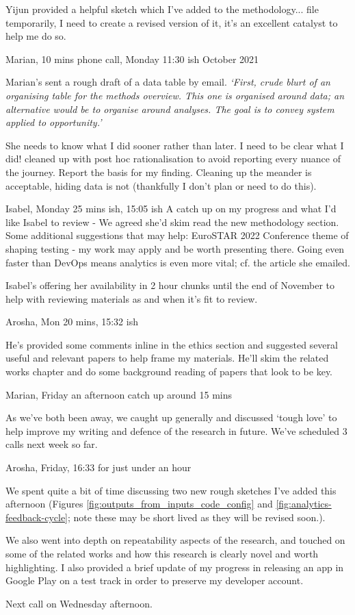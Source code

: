 Yijun provided a helpful sketch which I've added to the methodology... file temporarily, I need to create a revised version of it, it's an excellent catalyst to help me do so.

\dotfill
Marian, 10 mins phone call, Monday 11:30 ish  October 2021

Marian's sent a rough draft of a data table by email. 
\emph{`First, crude blurt of an organising table for the methods overview.  This one is organised around data;  an alternative would be to organise around analyses.  The goal is to convey system applied to opportunity.'}

She needs to know what I did sooner rather than later. I need to be clear what I did! cleaned up with post hoc rationalisation to avoid reporting every nuance of the journey. Report the basis for my finding. Cleaning up the meander is acceptable, hiding data is not (thankfully I don't plan or need to do this).

\dotfill
Isabel, Monday 25 mins ish, 15:05 ish
A catch up on my progress and what I'd like Isabel to review - We agreed she'd skim read the new methodology section. 
Some additional suggestions that may help: EuroSTAR 2022 Conference theme of shaping testing - my work may apply and be worth presenting there.
Going even faster than DevOps means analytics is even more vital; cf. the article she emailed. 

Isabel's offering her availability in 2 hour chunks until the end of November to help with reviewing materials as and when it's fit to review.

\dotfill
Arosha, Mon 20 mins, 15:32 ish

He's provided some comments inline in the ethics section and suggested several useful and relevant papers to help frame my materials. He'll skim the related works chapter and do some background reading of papers that look to be key.

\dotfill
Marian, Friday an afternoon catch up around 15 mins 

As we've both been away, we caught up generally and discussed `tough love' to help improve my writing and defence of the research in future. We've scheduled 3 calls next week so far.

\dotfill
Arosha, Friday, 16:33 for just under an hour

We spent quite a bit of time discussing two new rough sketches I've added this afternoon (Figures \ref{fig:outputs_from_inputs_code_config} and \ref{fig:analytics-feedback-cycle}; note these may be short lived as they will be revised soon.). 

We also went into depth on repeatability aspects of the research, and touched on some of the related works and how this research is clearly novel and worth highlighting. I also provided a brief update of my progress in releasing an app in Google Play on a test track in order to preserve my developer account. 

Next call on Wednesday afternoon.

\dotfill
